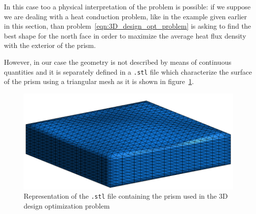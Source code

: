 In this case too a physical interpretation of the problem is possible: if we suppose we are dealing with a heat conduction problem, like in the example given earlier in this section, than problem~\eqref{eqn:3D_design_opt_problem} is asking to find the best shape for the north face in order to maximize the average heat flux density with the exterior of the prism.

\medskip
However, in our case the geometry is not described by means of continuous quantities and it is separately defined in a \verb|.stl| file which characterize the surface of the prism using a triangular mesh as it is shown in figure~\ref{fig:3D_cube_stl_initial}.

\begin{figure}
	\centering
	\includegraphics[width=.5\textwidth]{img/3D_cube_as_stl_cropped_1}
	\caption{Representation of the \texttt{.stl} file containing the prism used in the $3$D design optimization problem}
	\label{fig:3D_cube_stl_initial}
\end{figure}

